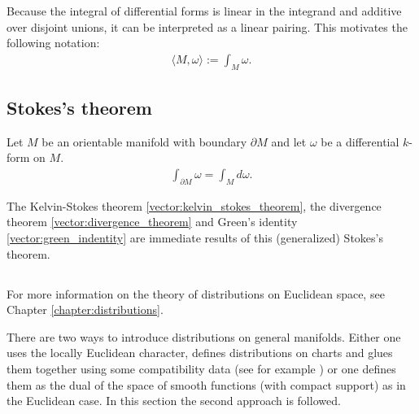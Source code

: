 
    \begin{notation}
        Because the integral of differential forms is linear in the integrand and additive over disjoint unions, it can be interpreted as a linear pairing. This motivates the following notation:
        \begin{gather}
            \langle M,\omega \rangle := \int_M\omega.
        \end{gather}
    \end{notation}

\subsection{Stokes's theorem}

    \begin{theorem}\label{bundle:stokes_theorem}
        Let $M$ be an orientable manifold with boundary $\partial M$ and let $\omega$ be a differential $k$-form on $M$.
        \begin{gather}
            \int_{\partial M}\omega = \int_M d\omega.
        \end{gather}
    \end{theorem}
    \begin{result}
        The Kelvin-Stokes theorem \ref{vector:kelvin_stokes_theorem}, the divergence theorem \ref{vector:divergence_theorem} and Green's identity \ref{vector:green_indentity} are immediate results of this (generalized) Stokes's theorem.
    \end{result}

\subsection{}

    For more information on the theory of distributions on Euclidean space, see Chapter \ref{chapter:distributions}.

    There are two ways to introduce distributions on general manifolds. Either one uses the locally Euclidean character, defines distributions on charts and glues them together using some compatibility data (see for example \cite{AMP1}) or one defines them as the dual of the space of smooth functions (with compact support) as in the Euclidean case. In this section the second approach is followed.

